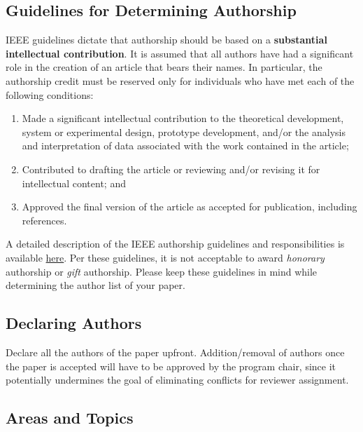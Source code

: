 \documentclass{sig-alternate}
\begin{document}
\subsection{Guidelines for Determining Authorship}


IEEE guidelines dictate that authorship should be based on a {\bf
  substantial intellectual contribution}. It is assumed that all
authors have had a significant role in the creation of an article that
bears their names. In particular, the authorship credit must be
reserved only for individuals who have met each of the following
conditions:

\begin{enumerate}

\item Made a significant intellectual contribution to the theoretical
  development, system or experimental design, prototype development,
  and/or the analysis and interpretation of data associated with the
  work contained in the article;

\item Contributed to drafting the article or reviewing and/or revising
  it for intellectual content; and

\item Approved the final version of the article as accepted for
  publication, including references.

\end{enumerate}

A detailed description of the IEEE authorship guidelines and
responsibilities is available
\href{https://www.ieee.org/publications_standards/publications/rights/Section821.html}{here}.
Per these guidelines, it is not acceptable to award {\em honorary }
authorship or {\em gift} authorship. Please keep these guidelines in
mind while determining the author list of your paper.


\subsection{Declaring Authors}

Declare all the authors of the paper upfront. Addition/removal of authors
once the paper is accepted will have to be approved by the program chair,
since it potentially undermines the goal of eliminating conflicts for
reviewer assignment.


\subsection{Areas and Topics}
\end{document}
